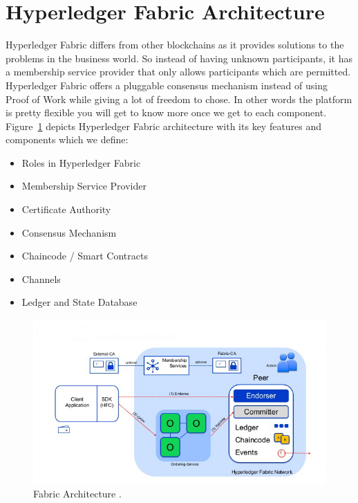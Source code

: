 \section{Hyperledger Fabric Architecture}
Hyperledger Fabric differs from other blockchains as it provides solutions to the problems in the business world. So instead of having unknown participants, it has a membership service provider that only allows participants which are permitted. Hyperledger Fabric offers a pluggable consensus mechanism instead of using Proof of Work while giving a lot of freedom to chose. In other words the platform is pretty flexible you will get to know more once we get to each component. Figure~\ref{fig:fabric_arch} depicts Hyperledger Fabric architecture with its key features and components which we define:
\begin{itemize}
    \item Roles in Hyperledger Fabric
     \item Membership Service Provider
     \item Certificate Authority
    \item Consensus Mechanism
    \item Chaincode / Smart Contracts 
    \item Channels
    \item Ledger and State Database
\end{itemize}
\begin{figure}[!htb]
    \centering
    \includegraphics[width=1\textwidth]{figures/HyperledgerArchitecture.jpg}
    \caption{Fabric Architecture \cite{technical-dive}.}
    \label{fig:fabric_arch}
\end{figure}

